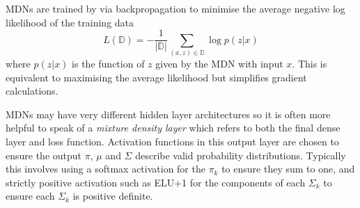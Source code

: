 \documentclass{article}
\numberwithin{figure}{section}
\theoremstyle{definition}
\begin{document}
MDNs are trained by via backpropagation to minimise the average negative log likelihood of the training data
$$L(\mathbb{D}) = -\frac1{|\mathbb{D}|} \sum_{(x,z) \in \mathbb{D}} \log p (z|x)$$
where $p(z|x)$ is the function of $z$ given by the MDN with input $x$.
This is equivalent to maximising the average likelihood but simplifies gradient calculations.

MDNs may have very different hidden layer architectures so it is often more helpful to speak of a \textit{mixture density layer} which refers to both the final dense layer and loss function.
Activation functions in this output layer are chosen to ensure the output $\pi$, $\mu$ and $\Sigma$ describe valid probability distributions.
Typically this involves using a softmax activation for the $\pi_k$ to ensure they sum to one, and strictly positive activation such as ELU+1 for the components of each $\Sigma_k$ to ensure each $\Sigma_k$ is positive definite.
\end{document}
